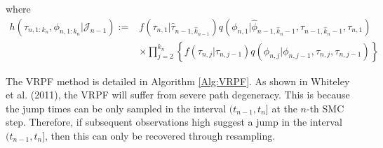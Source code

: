 \documentclass[12pt,a4paper]{article}
\begin{document}
where 
\begin{equation*}
\begin{split}
    h\left(\tau_{n,1:k_n},\phi_{n,1:k_n}|\mathcal{J}_{n-1}\right) := &f\left(\tau_{n,1}| \hat{\tau}_{n-1,\hat{k}_{n-1}}\right) q\left(\phi_{n,1}|\hat{\phi}_{n-1,\hat{k}_n-1},\hat{\tau}_{n-1,\hat{k}_n-1},\tau_{n,1}\right)\\
    & \times \prod_{j=2}^{k_n} \left\{f(\tau_{n,j}|\tau_{n,j-1})q(\phi_{n,j}|\phi_{n,j-1},\tau_{n,j},\tau_{n,j-1})\right\}
\end{split}
\end{equation*}

The VRPF method is detailed in Algorithm \ref{Alg:VRPF}. As shown in Whiteley et al. (2011), the VRPF will suffer from severe path degeneracy. This is because the jump times can be only sampled in the interval $(t_{n-1},t_n]$ at the $n$-th SMC step. Therefore, if subsequent observations high suggest a jump in the interval $(t_{n-1},t_n]$, then this can only be recovered through resampling.
\end{document}
